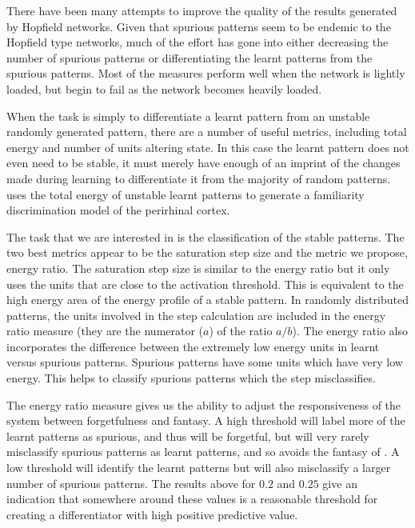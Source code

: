 There have been many attempts to improve the quality of the results generated by Hopfield networks.  Given that spurious patterns seem to be endemic to the Hopfield type networks, much of the effort has gone into either decreasing the number of spurious patterns or differentiating the learnt patterns from the spurious patterns.  Most of the measures perform well when the network is lightly loaded, but begin to fail as the network becomes heavily loaded.  

When the task is simply to differentiate a learnt pattern from an unstable randomly generated pattern, there are a number of useful metrics, including total energy and number of units altering state.  In this case the learnt pattern does not even need to be stable, it must merely have enough of an imprint of the changes made during learning to differentiate it from the majority of random patterns.  \citet{Bogacz2001} uses the total energy of unstable learnt patterns to generate a familiarity discrimination model of the perirhinal cortex.

The task that we are interested in is the classification of the stable patterns.  The two best metrics appear to be the saturation step size and the metric we propose, energy ratio.  The saturation step size is similar to the energy ratio but it only uses the units that are close to the activation threshold.  This is equivalent to the high energy area of the energy profile of a stable pattern.  In randomly distributed patterns, the units involved in the step calculation are included in the energy ratio measure (they are the numerator ($a$) of the ratio $a/b$).  The energy ratio also incorporates the difference between the extremely low energy units in learnt versus spurious patterns.  Spurious patterns have some units which have very low energy.  This helps to classify spurious patterns which the step misclassifies.

The energy ratio measure gives us the ability to adjust the responsiveness of the system between forgetfulness and fantasy.  A high threshold will label more of the learnt patterns as spurious, and thus will be forgetful, but will very rarely misclassify spurious patterns as learnt patterns, and so avoids the fantasy of \dejavu.  A low threshold will identify the learnt patterns but will also misclassify a larger number of spurious patterns.  The results above for $0.2$ and $0.25$ give an indication that somewhere around these values is a reasonable threshold for creating a differentiator with high positive predictive value.

